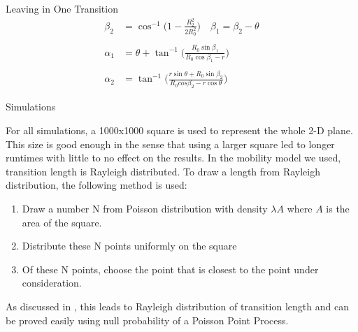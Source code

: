 \documentclass{beamer}
\begin{document}
\begin{frame}{Leaving in One Transition}{}
\begin{align*}
        \beta_2 &= \cos^{-1}\bigg(1-\frac{R_2^2}{2R_0^2}\bigg) 
	\quad
	\beta_1 = \beta_2 - \theta \\
	&\\
	\alpha_1 &= \theta + \tan^{-1}\bigg( \frac{R_0\sin\beta_1}{R_0\cos\beta_1-r}\bigg)\\
			& \\
        \alpha_2 &= \tan^{-1}\bigg( \frac{r\sin\theta + R_0\sin\beta_2}{R_0cos\beta_2 - r\cos\theta} \bigg)
\end{align*}
\end{frame}



\begin{frame}{Simulations} {}

For all simulations, a 1000x1000 square is used to represent the whole 2-D plane. This size is good enough in the sense that using a larger square led to longer runtimes with little to no 
effect on the results. In the mobility model we used, transition length is Rayleigh distributed. To draw a length from Rayleigh distribution, the following method is used:

\begin{enumerate}
	\item Draw a number N from Poisson distribution with density $\lambda A$ where $A$ is the area of the square.
	\item Distribute these N points uniformly on the square 
	\item Of these N points, choose the point that is closest to the point under consideration. 
\end{enumerate}

As discussed in \cite{ganti}, this leads to Rayleigh distribution of transition length and can be proved easily using null probability of a Poisson Point Process. 

\end{frame}
\end{document}
